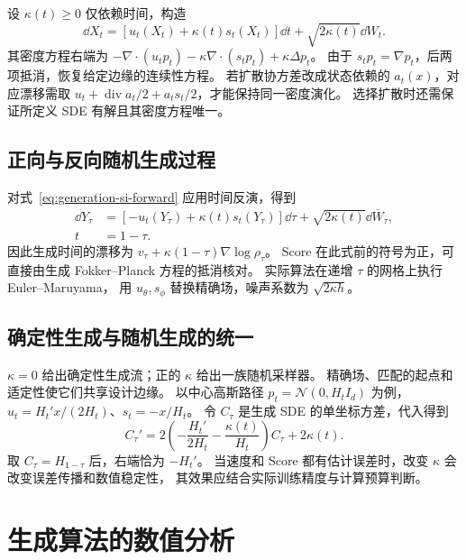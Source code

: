 设 \(\kappa(t)\ge0\) 仅依赖时间，构造
\begin{equation}
 \dd X_t=[u_t(X_t)+\kappa(t)s_t(X_t)]\dd t
                           +\sqrt{2\kappa(t)}\dd W_t.
 \label{eq:generation-si-forward}
\end{equation}
其密度方程右端为
\(-\nabla\cdot(u_tp_t)-\kappa\nabla\cdot(s_tp_t)+\kappa\Delta p_t\)。
由于 \(s_tp_t=\nabla p_t\)，后两项抵消，恢复给定边缘的连续性方程。
若扩散协方差改成状态依赖的 \(a_t(x)\)，对应漂移需取
\(u_t+\operatorname{div}a_t/2+a_ts_t/2\)，才能保持同一密度演化。
选择扩散时还需保证所定义 SDE 有解且其密度方程唯一。

\subsection{正向与反向随机生成过程}

对式~\eqref{eq:generation-si-forward} 应用时间反演，得到
\begin{equation}
 \begin{aligned}
 \dd Y_\tau&=[-u_t(Y_\tau)+\kappa(t)s_t(Y_\tau)]\dd\tau
                              +\sqrt{2\kappa(t)}\dd\overline W_\tau,\\
 t&=1-\tau.
 \end{aligned}
 \label{eq:generation-si-reverse}
\end{equation}
因此生成时间的漂移为 \(v_\tau+\kappa(1-\tau)\nabla\log\rho_\tau\)。
Score 在此式前的符号为正，可直接由生成 Fokker--Planck 方程的抵消核对。
实际算法在递增 \(\tau\) 的网格上执行 Euler--Maruyama，
用 \(u_\theta,s_\phi\) 替换精确场，噪声系数为 \(\sqrt{2\kappa h}\)。

\subsection{确定性生成与随机生成的统一}

\(\kappa=0\) 给出确定性生成流；正的 \(\kappa\) 给出一族随机采样器。
精确场、匹配的起点和适定性使它们共享设计边缘。
以中心高斯路径 \(p_t=\mathcal N(0,H_tI_d)\) 为例，
\(u_t=H_t'x/(2H_t)\)、\(s_t=-x/H_t\)。
令 \(C_\tau\) 是生成 SDE 的单坐标方差，代入得到
\[
 C_\tau'=2\left(-\frac{H_t'}{2H_t}-\frac{\kappa(t)}{H_t}\right)C_\tau
                       +2\kappa(t).
\]
取 \(C_\tau=H_{1-\tau}\) 后，右端恰为 \(-H_t'\)。
当速度和 Score 都有估计误差时，改变 \(\kappa\) 会改变误差传播和数值稳定性，
其效果应结合实际训练精度与计算预算判断。

\section{生成算法的数值分析}
\label{sec:generation-numerics}


